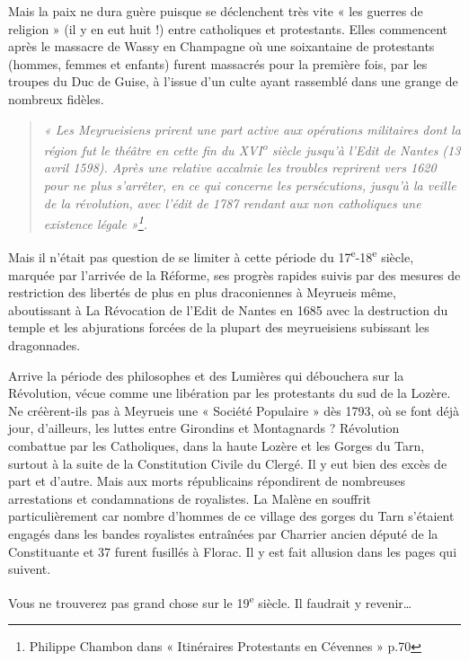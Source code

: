 Mais la paix ne dura guère puisque se déclenchent très vite « les guerres de religion » (il y en eut huit !) entre catholiques et protestants. Elles commencent après le massacre de Wassy en Champagne où une soixantaine de protestants (hommes, femmes et enfants) furent massacrés pour la première fois, par les troupes du Duc de Guise, à l’issue d’un culte ayant rassemblé dans une grange de nombreux fidèles.

\begin{quote}
\itshape
« Les Meyrueisiens prirent une part active aux opérations militaires dont la région fut le théâtre en cette fin du XVI\textsuperscript{o} siècle jusqu’à l’Edit de Nantes (13 avril 1598). Après une relative accalmie les troubles reprirent vers 1620 pour ne plus s’arrêter, en ce qui concerne les persécutions, jusqu’à la veille de la révolution, avec l’édit de 1787 rendant aux non catholiques une existence légale »\footnote{Philippe Chambon dans « Itinéraires Protestants en Cévennes » p.70}.
\end{quote}


Mais il n’était pas question de se limiter à cette période du 17\textsuperscript{e}-18\textsuperscript{e} siècle, marquée par l’arrivée de la Réforme, ses progrès rapides suivis par des mesures de restriction des libertés de plus en plus draconiennes à Meyrueis même, aboutissant à La Révocation de l’Edit de Nantes en 1685 avec la destruction du temple et les abjurations forcées de la plupart des meyrueisiens subissant les dragonnades.

Arrive la période des philosophes et des Lumières qui débouchera sur la Révolution, vécue comme une libération par les protestants du sud de la Lozère. Ne créèrent-ils pas à Meyrueis une « Société Populaire » dès 1793, où se font déjà jour, d’ailleurs, les luttes entre Girondins et Montagnards ? Révolution combattue par les Catholiques, dans la haute Lozère et les Gorges du Tarn, surtout à la suite de la Constitution Civile du Clergé. Il y eut bien des excès de part et d’autre. Mais aux morts républicains répondirent de nombreuses arrestations et condamnations de royalistes. La Malène en souffrit particulièrement car nombre d'hommes de ce village des gorges du Tarn s’étaient engagés dans les bandes royalistes entraînées par Charrier ancien député de la Constituante et 37 furent fusillés à Florac. Il y est fait allusion dans les pages qui suivent.

Vous ne trouverez pas grand chose sur le 19\textsuperscript{e} siècle. Il faudrait y revenir…

